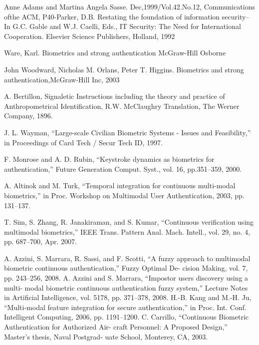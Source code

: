 \begin{thebibliography}{77}
Anne Adams and Martina Angela Sasse.
Dec,1999/Vol.42.No.12, Communications ofthe ACM,
P40-Parker, D.B. Restating the foundation of information security-- In G.C.
Gable and W.J. Caelli, Eds., IT Security: The Need for International Cooperation.
Elsevier Science Publishers, Holland, 1992

 Ware, Karl.
Biometrics and strong authentication McGraw-Hill Osborne

John Woodward, Nicholas M. Orlans, Peter T. Higgins.
Biometrics and strong authentication,McGraw-Hill Inc, 2003

A. Bertillon,
Signaletic Instructions including the theory and practice of Anthropometrical Identification, R.W.
McClaughry Translation, The Werner Company, 1896.

J. L. Wayman,
“Large-scale Civilian Biometric Systems - Issues and Feasibility,” in Proceedings of Card Tech /
Secur Tech ID, 1997.

F. Monrose and A. D. Rubin, 
“Keystroke dynamics as biometrics for authentication,” 
Future Generation Comput. Syst., vol. 16, pp.351–359, 2000.

A. Altinok and M. Turk, 
“Temporal integration for continuous multi-modal biometrics,”
in Proc. Workshop on Multimodal User Authentication, 2003, pp. 131–137.

T. Sim, S. Zhang, R. Janakiraman, and S. Kumar, 
“Continuous verification using multimodal biometrics,” 
IEEE Trans. Pattern Anal. Mach. Intell., vol. 29, no. 4, pp. 687–700, Apr. 2007.

A. Azzini, S. Marrara, R. Sassi, and F. Scotti, “A fuzzy approach to
multimodal biometric continuous authentication,” Fuzzy Optimal De-
cision Making, vol. 7, pp. 243–256, 2008.
A. Azzini and S. Marrara, “Impostor users discovery using a multi-
modal biometric continuous authentication fuzzy system,” Lecture
Notes in Artificial Intelligence, vol. 5178, pp. 371–378, 2008.
H.-B. Kang and M.-H. Ju, “Multi-modal feature integration for secure
authentication,” in Proc. Int. Conf. Intelligent Computing, 2006, pp.
1191–1200.
C. Carrillo, “Continuous Biometric Authentication for Authorized Air-
craft Personnel: A Proposed Design,” Master’s thesis, Naval Postgrad-
uate School, Monterey, CA, 2003.

\end{thebibliography}
